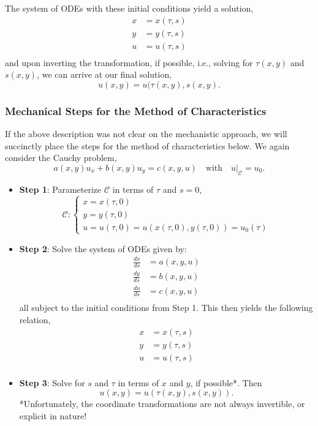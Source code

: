 \begin{enumerate}
\begin{itemize}
The system of ODEs with these initial conditions yield a solution, 
\begin{align*}
x&=x(\tau,s) \\
y&=y(\tau,s) \\
u&=u(\tau,s) \\ 
\end{align*}
and upon inverting the transformation, if possible, i.e., solving for $\tau(x,y)$ and $s(x,y)$, we can arrive at our final solution, $$u(x,y) = u(\tau(x,y),s(x,y).$$
 
\end{itemize}

\end{enumerate}

%
%
\subsubsection{Mechanical Steps for the Method of Characteristics}

If the above description was not clear on the mechanistic approach, we will succinctly place the steps for the method of characteristics below. We again consider the Cauchy problem, $$a(x,y) u_x + b(x,y) u_y = c(x,y,u) \ \ \ \mbox{ with } \ \ \ u|_{\mathscr{C}} = u_0.$$

\begin{itemize}
\item[] {\bf{Step 1}}: Parameterize $\mathscr{C}$ in terms of $\tau$ and $s=0$,  $$\mathscr{C}: \left\{ \begin{array}{c} x=x(\tau,0) \\ y=y(\tau,0) \\ u=u(\tau,0) = u(x(\tau,0),y(\tau,0)) = u_0(\tau) \end{array} \right.$$
\item[] {\bf{Step 2}}: Solve the system of ODEs given by:
\begin{align*}
\frac{dx}{ds} &= a(x,y,u) \\
\frac{dy}{ds} &= b(x,y,u) \\
\frac{du}{ds}&= c(x,y,u) \\
\end{align*}
all subject to the initial conditions from Step 1. This then yields the following relation,
\begin{align*}
x&=x(\tau,s) \\
y&=y(\tau,s) \\
u&=u(\tau,s) \\
\end{align*}
\item[] {\bf{Step 3}}:  Solve for $s$ and $\tau$ in terms of $x$ and $y$, if possible*. Then $$u(x,y) = u(\tau(x,y),s(x,y)).$$ *Unfortunately, the coordinate transformations are not always invertible, or explicit in nature!

\end{itemize}


